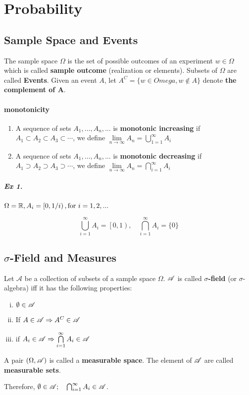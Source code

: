 \chapter{Probability}

\section{Sample Space and Events}
\leavevmode
The sample space $\Omega$ is the set of possible outcomes of an experiment $w\in \Omega$ which is called \textbf{sample outcome} (realization or elements). Subsets of $\Omega$ are called \textbf{Events}. Given an event $A$, let $A^C=\{w\in Omega,w\notin A\}$ denote \textbf{the complement of A}.
\subsubsection{monotonicity}
\begin{enumerate}
	\item A sequence of sets $A_1,\dots,A_n,\dots$ is \textbf{monotonic increasing} if $A_1\subset A_2 \subset A_3\subset\cdots$, we define $\lim\limits_{n\to\infty}A_n=\mathop{\bigcup}\limits_{1=1}^{\infty}A_i$
	\item  A sequence of sets $A_1,\dots,A_n,\dots$ is \textbf{monotonic decreasing} if $A_1\supset A_2 \supset A_3\supset \cdots$, we define $\lim\limits_{n\to\infty}A_n=\mathop{\bigcap}\limits_{i=1}^{\infty}A_i$
\end{enumerate}

	\paragraph{Ex 1.}
		$\Omega = \mathbb{R}, A_i=\left[0, 1/i\right), \text{for }i=1,2,...$
		
		$$\bigcup_{i=1}^{\infty}A_i=\left[0,1\right),\quad \bigcap_{i=1}^{\infty}A_i=\{0\}$$
		

\section{$\sigma$-Field and Measures}

\begin{definition}
	Let $\mathscr{A}$ be a collection of subsets of a sample space $\Omega$. $\mathscr{A}$ is called \textbf{$\sigma$-field} (or $\sigma$-algebra) iff it has the following properties:
	\begin{enumerate}[(i)]
		\item $\emptyset \in \mathscr{A}$
		\item If $A\in \mathscr{A} \Rightarrow A^C \in \mathscr{A}$
		\item if $A_i \in \mathscr{A}\Rightarrow \mathop{\bigcap}\limits_{i=1}^{\infty}A_i\in \mathscr{A}	$ 
	\end{enumerate}
	A pair $(\Omega, \mathscr{A})$ is called a \textbf{measurable space}. The element of $\mathscr{A}$ are called \textbf{measurable sets}.
\end{definition}
Therefore, $\emptyset \in \mathscr{A};\quad \mathop{\bigcap}_{i=1}^{\infty} A_i\in \mathscr{A}$.

